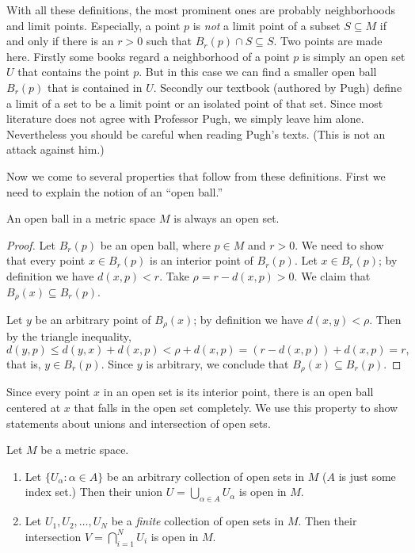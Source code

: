 With all these definitions, the most prominent ones are probably neighborhoods and limit points.
Especially, a point $p$ is {\em not} a limit point of a subset $S \subseteq M$ if and only if there is an $r > 0$ such that $B_r(p) \cap S \subseteq S$.
Two points are made here.  Firstly some books regard a neighborhood of a point $p$ is simply an open set $U$ that contains the point $p$.  But in this case we can find a smaller open ball $B_r(p)$ that is contained in $U$. 
Secondly our textbook (authored by Pugh) define a limit of a set to be a limit point or an isolated point of that set.
Since most literature does not agree with Professor Pugh, we simply leave him alone.  Nevertheless you should be careful when reading Pugh's texts.  (This is not an attack against him.)

Now we come to several properties that follow from these definitions.
First we need to explain the notion of an ``open ball.''

\begin{prop}
  An open ball in a metric space $M$ is always an open set.
\end{prop}

\begin{proof}
  Let $B_r(p)$ be an open ball, where $p \in M$ and $r > 0$.
  We need to show that every point $x \in B_r(p)$ is an interior point of $B_r(p)$.
  Let $x \in B_r(p)$; by definition we have $d(x,p) < r$.
  Take $\rho = r - d(x,p) > 0$.  We claim that $B_\rho(x) \subseteq B_r(p)$.

  Let $y$ be an arbitrary point of $B_\rho(x)$; by definition we have $d(x,y) < \rho$.
  Then by the triangle inequality,
  \[
    d(y,p) \leqslant d(y,x) + d(x,p) < \rho + d(x,p) = (r - d(x,p)) + d(x,p) = r,
  \]
  that is, $y \in B_r(p)$.
  Since $y$ is arbitrary, we conclude that $B_\rho(x) \subseteq B_r(p)$.
\end{proof}

Since every point $x$ in an open set is its interior point, there is an open ball centered at $x$ that falls in the open set completely.
We use this property to show statements about unions and intersection of open sets.

\begin{prop}
  \label{open-union-intersection}
  Let $M$ be a metric space.
  \begin{enumerate}[$(a)$]
    \item Let $\{ U_\alpha \colon \alpha \in A \}$ be an arbitrary collection of open sets in $M$ ($A$ is just some index set.)
      Then their union $U = \displaystyle \bigcup_{\alpha \in A} U_\alpha$ is open in $M$.

    \item Let $U_1, U_2, \dots, U_N$ be a {\em finite} collection of open sets in $M$.
      Then their intersection $V = \displaystyle \bigcap_{i=1}^N U_i$ is open in $M$.
  \end{enumerate}
\end{prop}


